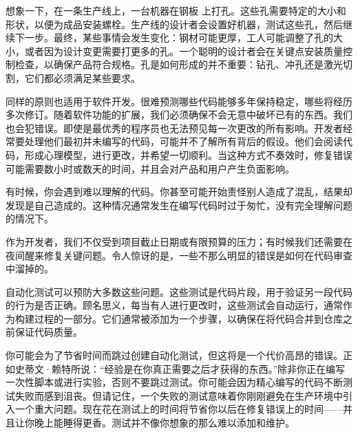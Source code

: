 想象一下，在一条生产线上，一台机器在钢板 上打孔。这些孔需要特定的大小和形状，以便为成品安装螺栓。生产线的设计者会设置好机器，测试这些孔，然后继续下一步。最终，某些事情会发生变化：钢材可能更厚，工人可能调整了孔的大小，或者因为设计变更需要打更多的孔。一个聪明的设计者会在关键点安装质量控制检查，以确保产品符合规格。孔是如何形成的并不重要：钻孔、冲孔还是激光切割，它们都必须满足某些要求。

同样的原则也适用于软件开发。很难预测哪些代码能够多年保持稳定，哪些将经历多次修订。随着软件功能的扩展，我们必须确保不会无意中破坏已有的东西。我们也会犯错误。即使是最优秀的程序员也无法预见每一次更改的所有影响。开发者经常要处理他们最初并未编写的代码，可能并不了解所有背后的假设。他们会阅读代码，形成心理模型，进行更改，并希望一切顺利。当这种方式不奏效时，修复错误可能需要数小时或数天的时间，并且会对产品和用户产生负面影响。

有时候，你会遇到难以理解的代码。你甚至可能开始责怪别人造成了混乱，结果却发现是自己造成的。这种情况通常发生在编写代码时过于匆忙，没有完全理解问题的情况下。

作为开发者，我们不仅受到项目截止日期或有限预算的压力；有时候我们还需要在夜间醒来修复关键问题。令人惊讶的是，一些不那么明显的错误是如何在代码审查中溜掉的。

自动化测试可以预防大多数这些问题。这些测试是代码片段，用于验证另一段代码的行为是否正确。顾名思义，每当有人进行更改时，这些测试会自动运行，通常作为构建过程的一部分。它们通常被添加为一个步骤，以确保在将代码合并到仓库之前保证代码质量。

你可能会为了节省时间而跳过创建自动化测试，但这将是一个代价高昂的错误。正如史蒂文·赖特所说：“经验是在你真正需要之后才获得的东西。”除非你正在编写一次性脚本或进行实验，否则不要跳过测试。你可能会因为精心编写的代码不断测试失败而感到沮丧。但请记住，一个失败的测试意味着你刚刚避免在生产环境中引入一个重大问题。现在花在测试上的时间将节省你以后在修复错误上的时间——并且让你晚上能睡得更香。测试并不像你想象的那么难以添加和维护。